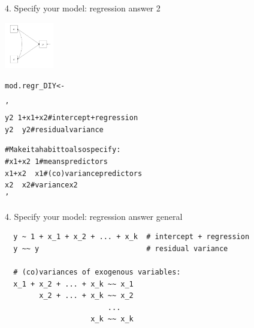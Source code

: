 \documentclass[10pt]{beamer}\usepackage[]{graphicx}\usepackage[]{xcolor}
\makeatletter
\newcommand{\hlstr}[1]{\textcolor[rgb]{0.192,0.494,0.8}{#1}}%
\newcommand{\hlstd}[1]{\textcolor[rgb]{0.345,0.345,0.345}{#1}}%
\newcommand{\hlkwb}[1]{\textcolor[rgb]{0.69,0.353,0.396}{#1}}%
\newenvironment{kframe}{%
 \def\at@end@of@kframe{}%
 \ifinner\ifhmode%
  \def\at@end@of@kframe{\end{minipage}}%
  \begin{minipage}{\columnwidth}%
 \fi\fi%
 \def\FrameCommand##1{\hskip\@totalleftmargin \hskip-\fboxsep
 \colorbox{shadecolor}{##1}\hskip-\fboxsep
     \hskip-\linewidth \hskip-\@totalleftmargin \hskip\columnwidth}%
 \MakeFramed {\advance\hsize-\width
   \@totalleftmargin\z@ \linewidth\hsize
   \@setminipage}}%
 {\par\unskip\endMakeFramed%
 \at@end@of@kframe}
\newenvironment{knitrout}{}{} %
\makeatother
\begin{document}
%
\begin{frame}[fragile]{4. Specify your model: regression answer 2}

\includegraphics[height=2cm, keepaspectratio=T] {regression_DIY.png} 

\begin{knitrout}
\color{fgcolor}\begin{kframe}
\begin{alltt}
\hlstd{mod.regr_DIY} \hlkwb{<-} \hlstr{'
  y2 ~ 1 + x1 + x2  # intercept + regression
  y2 ~~ y2          # residual variance
  
  # Make it a habit to also specify:
  #x1 + x2 ~ 1      # means predictors
  x1 + x2 ~~ x1     # (co)variance predictors 
  x2 ~~ x2          # variance x2
'}
\end{alltt}
\end{kframe}
\end{knitrout}

\end{frame}
%
\begin{frame}[fragile]{4. Specify your model: regression answer general}

\begin{verbatim}
  y ~ 1 + x_1 + x_2 + ... + x_k  # intercept + regression
  y ~~ y                         # residual variance
  
  # (co)variances of exogenous variables:
  x_1 + x_2 + ... + x_k ~~ x_1
        x_2 + ... + x_k ~~ x_2
                        ...
                    x_k ~~ x_k
\end{verbatim}

\end{frame}
%
\end{document}
